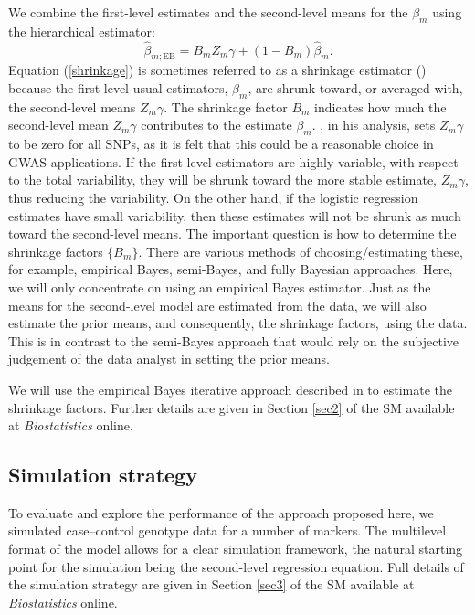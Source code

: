 \documentclass[oupdraft]{bio}
\begin{document}
We combine the first-level estimates and the second-level means
for the $\beta_m$ using the hierarchical estimator:
\begin{equation}
\hat{\beta}_{m; \mathrm{EB}} =
B_m Z_m \gamma + \left( 1 - B_m \right) \hat{\beta}_m.
\label{shrinkage}
\end{equation}
Equation (\ref{shrinkage}) is sometimes referred to as a
shrinkage estimator
(\citealp{TTC01})
because the first level usual
estimators, $\beta_m$, are shrunk toward, or averaged with,
the second-level means $Z_m \gamma$. The shrinkage factor
$B_m$ indicates how much the second-level mean $Z_m \gamma$
contributes to the estimate $\beta_m$.
\citet{Gichangi_Vach:2006},
in his analysis, sets $Z_m \gamma$ to be zero for all SNPs,
as it is felt that this could be a reasonable choice in GWAS
applications. If the first-level estimators are highly
variable, with respect to the total variability, they will
be shrunk toward the more stable estimate, $Z_m \gamma$,
thus reducing the variability. On the other hand, if the
logistic regression estimates have small variability, then
these estimates will not be shrunk as much toward the
second-level means. The important question is how to
determine the shrinkage factors $\{ B_m \}$. There are
various methods of choosing/estimating these, for example,
empirical Bayes, semi-Bayes, and fully Bayesian approaches.
Here, we will only concentrate on using an empirical Bayes
estimator. Just as the means for the second-level model are
estimated from the data, we will also estimate the prior means,
and consequently, the shrinkage factors, using the data.
This is in contrast to the semi-Bayes approach that would
rely on the subjective judgement of the data analyst in
setting the prior means.

We will use the empirical Bayes iterative approach described
in
\citet{Barlow_Bartholomew:1972}
to estimate the shrinkage factors. Further details are
given in Section \ref{sec2} of the SM available at
\textit{Biostatistics} online.


\subsection{Simulation strategy}

To evaluate and explore the performance of the approach
proposed here, we simulated case--control genotype data for
a number of markers. The multilevel format of the model allows
for a clear simulation framework, the natural starting point
for the simulation being the second-level regression equation.
Full details of the simulation strategy are given in
Section \ref{sec3} of the SM available at
\textit{Biostatistics} online.
\end{document}
